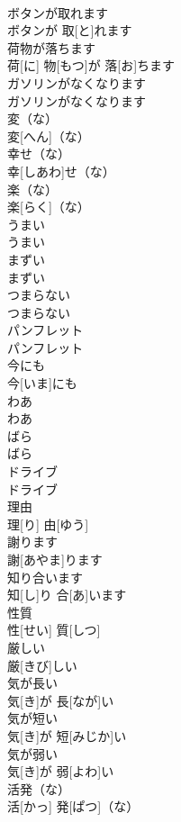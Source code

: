 \documentclass[8pt]{extreport}
\begin{document}
\begin{CJK}{UTF8}{min}
\\	ボタンが取れます	
\\	ボタンが 取[と]れます		
\\	荷物が落ちます	
\\	荷[に] 物[もつ]が 落[お]ちます		
\\	ガソリンがなくなります	
\\	ガソリンがなくなります		
\\	変（な）	
\\	変[へん]（な）		
\\	幸せ（な）	
\\	幸[しあわ]せ（な）		
\\	楽（な）	
\\	楽[らく]（な）		
\\	うまい	
\\	うまい		
\\	まずい	
\\	まずい		
\\	つまらない	
\\	つまらない		
\\	パンフレット	
\\	パンフレット		
\\	今にも	
\\	今[いま]にも		
\\	わあ	
\\	わあ		
\\	ばら	
\\	ばら		
\\	ドライブ	
\\	ドライブ		
\\	理由	
\\	理[り] 由[ゆう]		
\\	謝ります	
\\	謝[あやま]ります		
\\	知り合います	
\\	知[し]り 合[あ]います		
\\	性質	
\\	性[せい] 質[しつ]		
\\	厳しい	
\\	厳[きび]しい		
\\	気が長い	
\\	気[き]が 長[なが]い		
\\	気が短い	
\\	気[き]が 短[みじか]い		
\\	気が弱い	
\\	気[き]が 弱[よわ]い		
\\	活発（な）	
\\	活[かっ] 発[ぱつ]（な）		

\end{CJK}
\end{document}
